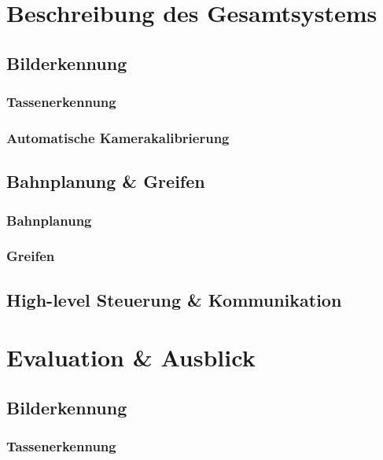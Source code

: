 \documentclass[de,ids]{fziartcl}
\begin{document}
\section{Beschreibung des Gesamtsystems} %
\subsection{Bilderkennung}
\subsubsection{Tassenerkennung}
\label{4-1-1_gesamtsystem_bilderkennung_tassenerkennung}
\subsubsection{Automatische Kamerakalibrierung}
\label{4-1-2_gesamtsystem_bilderkennung_automatische_Kamerakalibrierung}
\subsection{Bahnplanung \& Greifen}
\subsubsection{Bahnplanung}
\subsubsection{Greifen}
\subsection{High-level Steuerung \& Kommunikation}

\section{Evaluation \& Ausblick} %
\subsection{Bilderkennung}
\subsubsection{Tassenerkennung}
\end{document}
